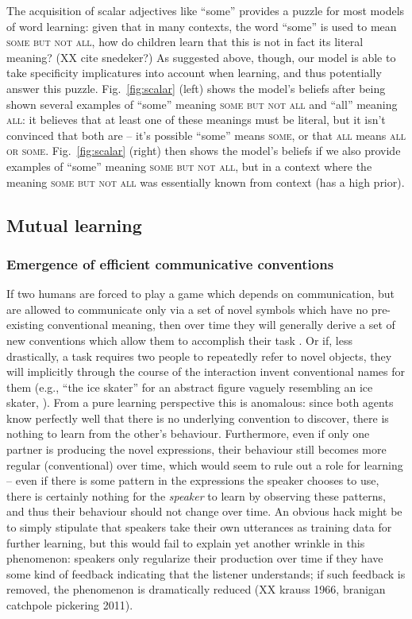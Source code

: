 \documentclass{article} %
\begin{document}
The acquisition of scalar adjectives like ``some'' provides a puzzle for most models of word learning: given that in many contexts, the word ``some'' is used to mean \textsc{some but not all}, how do children learn that this is not in fact its literal meaning? (XX cite snedeker?) As suggested above, though, our model is able to take specificity implicatures into account when learning, and thus potentially answer this puzzle. Fig.~\ref{fig:scalar} (left) shows the model's beliefs after being shown several examples of ``some'' meaning \textsc{some but not all} and ``all'' meaning \textsc{all}: it believes that at least one of these meanings must be literal, but it isn't convinced that both are -- it's possible ``some'' means \textsc{some}, or that \textsc{all} means \textsc{all or some}. Fig.~\ref{fig:scalar} (right) then shows the model's beliefs if we also provide examples of ``some'' meaning \textsc{some but not all}, but in a context where the meaning \textsc{some but not all} was essentially known from context (has a high prior). 

\subsection{Mutual learning}

\subsubsection{Emergence of efficient communicative conventions}

If two humans are forced to play a game which depends on communication, but are allowed to communicate only via a set of novel symbols which have no pre-existing conventional meaning, then over time they will generally derive a set of new conventions which allow them to accomplish their task \cite{galantucci2005}. Or if, less drastically, a task requires two people to repeatedly refer to novel objects, they will implicitly through the course of the interaction invent conventional names for them (e.g., ``the ice skater'' for an abstract figure vaguely resembling an ice skater, \cite{clark1986}). From a pure learning perspective this is anomalous: since both agents know perfectly well that there is no underlying convention to discover, there is nothing to learn from the other's behaviour. Furthermore, even if only one partner is producing the novel expressions, their behaviour still becomes more regular (conventional) over time, which would seem to rule out a role for learning -- even if there is some pattern in the expressions the speaker chooses to use, there is certainly nothing for the \textit{speaker} to learn by observing these patterns, and thus their behaviour should not change over time. An obvious hack might be to simply stipulate that speakers take their own utterances as training data for further learning, but this would fail to explain yet another wrinkle in this phenomenon: speakers only regularize their production over time if they have some kind of feedback indicating that the listener understands; if such feedback is removed, the phenomenon is dramatically reduced (XX krauss 1966, branigan catchpole pickering 2011).
\end{document}
